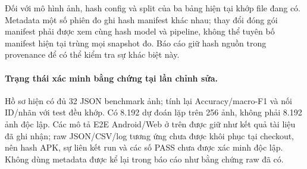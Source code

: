 Đối với mô hình ảnh, hash config và split của ba bảng hiện tại khớp file đang có. Metadata một số phiên đo ghi hash manifest khác nhau; thay đổi đóng gói manifest phải được xem cùng hash model và pipeline, không thể tuyên bố manifest hiện tại trùng mọi snapshot đo. Báo cáo giữ hash nguồn trong provenance để có thể kiểm tra sự khác biệt này.

\paragraph{Trạng thái xác minh bằng chứng tại lần chỉnh sửa.} Hồ sơ hiện có đủ 32 JSON benchmark ảnh; tính lại Accuracy/macro-F1 và nối ID/nhãn với test đều khớp. Có 8.192 dự đoán lặp trên 256 ảnh, không phải 8.192 ảnh độc lập. Các mô tả E2E Android/Web ở trên được giữ như kết quả tài liệu đã ghi nhận; raw JSON/CSV/log tương ứng chưa được khôi phục tại checkout, nên hash APK, sự liên kết run và các số PASS chưa được xác minh độc lập. Không dùng metadata được kể lại trong báo cáo như bằng chứng raw đã có.

